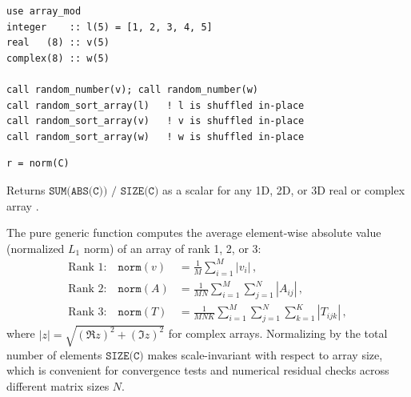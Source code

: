\begin{description}[leftmargin=2.2cm, style=nextline]
\end{description}

\lstset{language=[95]Fortran}
\begin{lstlisting}
use array_mod
integer    :: l(5) = [1, 2, 3, 4, 5]
real   (8) :: v(5)
complex(8) :: w(5)

call random_number(v); call random_number(w)
call random_sort_array(l)   ! l is shuffled in-place
call random_sort_array(v)   ! v is shuffled in-place
call random_sort_array(w)   ! w is shuffled in-place
\end{lstlisting}


\lstset{language=[95]Fortran}
\begin{lstlisting}
r = norm(C)
\end{lstlisting}

Returns $\texttt{SUM(ABS(C)) / SIZE(C)}$ as a  scalar for any 1D, 2D, or 3D real or complex array .

The pure generic function  computes the average element-wise absolute value (normalized $L_1$ norm) of an array  of rank 1, 2, or 3:
\begin{align}
  \text{Rank 1:}\quad \texttt{norm}(v) &= \frac{1}{M}\sum_{i=1}^{M} |v_i|\, , \\
  \text{Rank 2:}\quad \texttt{norm}(A) &= \frac{1}{M N}\sum_{i=1}^{M}\sum_{j=1}^{N} |A_{ij}|\, , \\
  \text{Rank 3:}\quad \texttt{norm}(T) &= \frac{1}{M N K}\sum_{i=1}^{M}\sum_{j=1}^{N}\sum_{k=1}^{K} |T_{ijk}|\, ,
\end{align}
where $|z| = \sqrt{(\Re z)^2 + (\Im z)^2}$ for complex arrays. Normalizing by the total number of elements $\texttt{SIZE(C)}$ makes  scale-invariant with respect to array size, which is convenient for convergence tests and numerical residual checks across different matrix sizes $N$.


